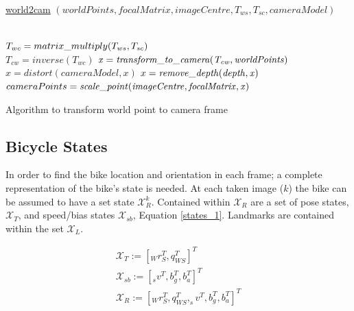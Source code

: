 \documentclass[11pt,twoside]{report}
\begin{document}
\begin{algorithm}[H]
	\DontPrintSemicolon
	\SetAlgoLined
	\underline{world2cam} $(worldPoints,focalMatrix,imageCentre,T_{ws},T_{sc},cameraModel)$\;
	
	\texttt{\\}
	$T_{wc} = matrix\text{\textunderscore}multiply(T_{ws},T_{sc})$
	\texttt{\\}
	$T_{cw} = inverse(T_{wc})$ 
	$\mathit{x} = \mathit{transform\text{\textunderscore}to\text{\textunderscore}camera(T_{cw},worldPoints)}$ 
	$x = \mathit{distort(cameraModel,x)}$ 
	$x = \mathit{remove\text{\textunderscore}depth(depth,x)}$ 
	$cameraPoints = \mathit{scale\text{\textunderscore}point(imageCentre,focalMatrix,x)}$ 

	\caption{Algorithm to transform world point to camera frame}
	\label{alg:weights}
\end{algorithm}


\subsection{Bicycle States}

In order to find the bike location and orientation in each frame; a complete representation of the bike's state is needed. At each taken image ($k$) the bike can be assumed to have a set state $\mathcal{X}_{R}^{k}$. Contained within $\mathcal{X}_{R}$ are a set of pose states, $\mathcal{X}_{T}$, and speed/bias states $\mathcal{X}_{sb}$, Equation \ref{states_1}. Landmarks are contained within the set $\mathcal{X}_{L}$.

\begin{equation}
\begin{aligned}
\label{states_1}
\mathcal{X}_{T} := [ _{W}r_{S}^{T},q_{WS}^{T} ]^{T} \\
\mathcal{X}_{sb} := [ _{s}v^{T},b_{g}^{T}, b_{a}^{T} ]^{T} \\
\mathcal{X}_{R} := [ _{W}r_{S}^{T},q_{WS}^{T},_{s}v^{T},b_{g}^{T}, b_{a}^{T}]^{T}
\end{aligned}
\end{equation}
\end{document}
